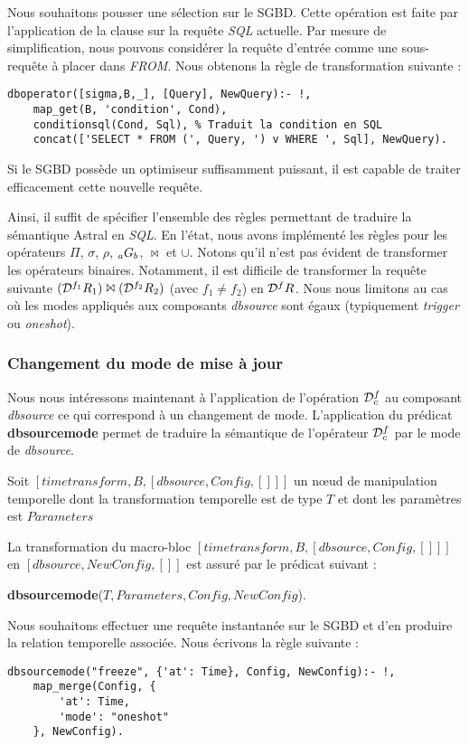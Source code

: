 \begin{example}
    Nous souhaitons pousser une sélection sur le SGBD. Cette opération est faite par l'application de la clause  sur la requête \textit{SQL} actuelle. Par mesure de simplification, nous pouvons considérer la requête d'entrée comme une sous-requête à placer dans \textit{FROM}. Nous obtenons la règle de transformation suivante :
    \begin{lstlisting}
dboperator([sigma,B,_], [Query], NewQuery):- !,
    map_get(B, 'condition', Cond),
    conditionsql(Cond, Sql), % Traduit la condition en SQL
    concat(['SELECT * FROM (', Query, ') v WHERE ', Sql], NewQuery).
    \end{lstlisting}

    Si le SGBD possède un optimiseur suffisamment puissant, il est capable de traiter efficacement cette nouvelle requête.
\end{example}

Ainsi, il suffit de spécifier l'ensemble des règles permettant de traduire la sémantique Astral en \textit{SQL}. En l'état, nous avons implémenté les règles pour les opérateurs $\Pi$, $\sigma$, $\rho$, $\null_a G_b$, $\Join$ et $\cup$. Notons qu'il n'est pas évident de transformer les opérateurs binaires. Notamment, il est difficile de transformer la requête suivante $(\mathcal{D}^{f_1} R_1)\Join (\mathcal{D}^{f_2} R_2)$ (avec $f_1\neq f_2$) en $\mathcal{D}^{f} R$. Nous nous limitons au cas où les modes appliqués aux composants \textit{dbsource} sont égaux (typiquement \textit{trigger} ou \textit{oneshot}).

\subsubsection{Changement du mode de mise à jour}
Nous nous intéressons maintenant à l'application de l'opération $\mathcal{D}^f_c$ au composant \textit{dbsource} ce qui correspond à un changement de mode. L'application du prédicat \textbf{dbsourcemode} permet de traduire la sémantique de l'opérateur $\mathcal{D}^f_c$ par le mode de \textit{dbsource}.
\begin{regle}
    Soit $[timetransform,B,[dbsource, Config, []]]$ un nœud de manipulation temporelle dont la transformation temporelle est de type $T$ et dont les paramètres est $Parameters$

    La transformation du macro-bloc $[timetransform,B,[dbsource, Config, []]]$ en $[dbsource,NewConfig,[]]$ est assuré par le prédicat suivant :
    \begin{center} \textbf{dbsourcemode}($T, Parameters, Config, NewConfig$).\end{center}
\end{regle}
\begin{example}
    Nous souhaitons effectuer une requête instantanée sur le SGBD et d'en produire la relation temporelle associée. Nous écrivons la règle suivante :
    \begin{lstlisting}
dbsourcemode("freeze", {'at': Time}, Config, NewConfig):- !,
    map_merge(Config, {
        'at': Time,
        'mode': "oneshot"
    }, NewConfig).
    \end{lstlisting}
\end{example}

